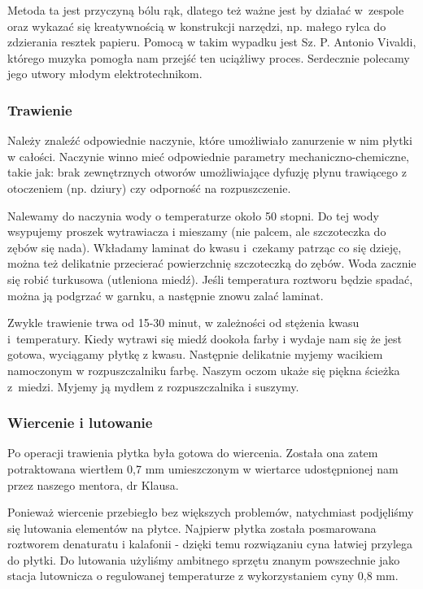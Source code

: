 Metoda ta jest przyczyną bólu rąk, dlatego też ważne jest by działać w~zespole oraz wykazać się kreatywnością w konstrukcji narzędzi, np. małego rylca do zdzierania resztek papieru. Pomocą w takim wypadku jest Sz. P. Antonio Vivaldi, którego muzyka pomogła nam przejść ten uciążliwy proces. Serdecznie polecamy jego utwory młodym elektrotechnikom.

\subsubsection{Trawienie}

Należy znaleźć odpowiednie naczynie, które umożliwiało zanurzenie w nim płytki w całości. Naczynie winno mieć odpowiednie parametry mechaniczno-chemiczne, takie jak: brak zewnętrznych otworów umożliwiające dyfuzję płynu trawiącego z otoczeniem (np. dziury) czy odporność na rozpuszczenie.

Nalewamy do naczynia wody o temperaturze około 50 stopni. Do tej wody wsypujemy proszek wytrawiacza i mieszamy (nie palcem, ale szczoteczka do zębów się nada). Wkładamy laminat do kwasu i~czekamy patrząc co się dzieję, można też delikatnie przecierać powierzchnię szczoteczką do zębów. Woda zacznie się robić turkusowa (utleniona miedź). Jeśli temperatura roztworu będzie spadać, można ją podgrzać w garnku, a następnie znowu zalać laminat. 

Zwykle trawienie trwa od 15-30 minut, w zależności od stężenia kwasu i~temperatury. Kiedy wytrawi się miedź dookoła farby i wydaje nam się że jest gotowa, wyciągamy płytkę z kwasu. Następnie delikatnie myjemy wacikiem namoczonym w rozpuszczalniku farbę. Naszym oczom ukaże się piękna ścieżka z~miedzi. Myjemy ją mydłem z rozpuszczalnika i suszymy.

\subsubsection{Wiercenie i lutowanie}

Po operacji trawienia płytka była gotowa do wiercenia. Została ona zatem potraktowana wiertłem 0,7 mm umieszczonym w wiertarce udostępnionej nam przez naszego mentora, dr Klausa. 

Ponieważ wiercenie przebiegło bez większych problemów, natychmiast podjęliśmy się lutowania elementów na płytce. Najpierw płytka została posmarowana roztworem denaturatu i kalafonii - dzięki temu rozwiązaniu cyna łatwiej przylega do płytki. Do lutowania użyliśmy ambitnego sprzętu znanym powszechnie jako stacja lutownicza o regulowanej temperaturze z wykorzystaniem cyny 0,8 mm.

